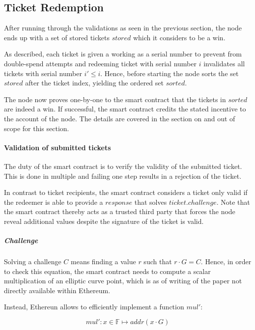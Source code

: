 \subsection{Ticket Redemption}
\label{sec:tickets:redemption}

After running through the validations as seen in the previous section, the node ends up with a set of stored tickets $stored$ which it considers to be a win.

As described, each ticket is given a  working as a serial number to prevent from double-spend attempts and redeeming ticket with serial number $i$ invalidates all tickets with serial number $i' \le i$. Hence, before starting the node sorts the set $stored$ after the ticket index, yielding the ordered set $sorted$.

The node now proves one-by-one to the smart contract that the tickets in $sorted$ are indeed a win. If successful, the smart contract credits the stated incentive to the account of the node. The details are covered in the section on  and out of scope for this section.

\paragraph{Validation of submitted tickets}
\label{sec:tickets:redemption:submitted}

The duty of the smart contract is to verify the validity of the submitted ticket. This is done in multiple and failing one step results in a rejection of the ticket.

In contrast to ticket recipients, the smart contract considers a ticket only valid if the redeemer is able to provide a $response$ that solves $ticket.challenge$. Note that the smart contract thereby acts as a trusted third party that forces the node reveal additional values despite the signature of the ticket is valid.

\subparagraph{Challenge} Solving a challenge $C$ means finding a value $r$ such that $r \cdot G =C$. Hence, in order to check this equation, the smart contract needs to compute a scalar multiplication of an elliptic curve point, which is as of writing of the paper not directly available within Ethereum.

Instead, Ethereun allows to efficiently implement a function $mul'$:

$$ mul': x \in \mathbb{F} \mapsto addr (x \cdot G)$$

